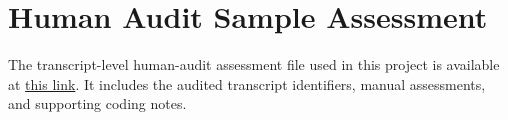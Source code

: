\section{Human Audit Sample Assessment}\label{sec:si_human_audit_sample_assessment}

The transcript-level human-audit assessment file used in this project is available at \href{https://docs.google.com/spreadsheets/d/1P_6i2wgsuJwIe1ML3wEp_iNEIZQtI8nj/edit?usp=share_link&ouid=103675238077291434889&rtpof=true&sd=true}{this link}. It includes the audited transcript identifiers, manual assessments, and supporting coding notes.
